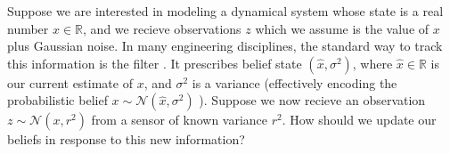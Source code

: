 \begin{example}
	\label{ex:kalman1d}
\def\estx{\hat{x}}
Suppose we are interested in modeling a
dynamical system whose state is a real number
$x \in \mathbb R$, and we recieve observations
$z$ which we assume is the value of $x$
plus Gaussian noise.
In many engineering disciplines, the
 standard way to track this information is
the \citeauthor{kalman1960new} filter
    \cite{kalman1960new}.
It prescribes belief state $(\estx, \sigma^2)$,
where $\estx \in \mathbb R$ is our current estimate of
$x$, and
$\sigma^2$ is a variance
(effectively encoding the probabilistic belief
$x \sim \mathcal N(\estx, \sigma^2)$
).
%
Suppose we now recieve an observation
$z \sim \mathcal N(x, r^2)$ from a sensor of known variance $r^2$.
How should we update our beliefs in response
to this new information?


\end{example}

